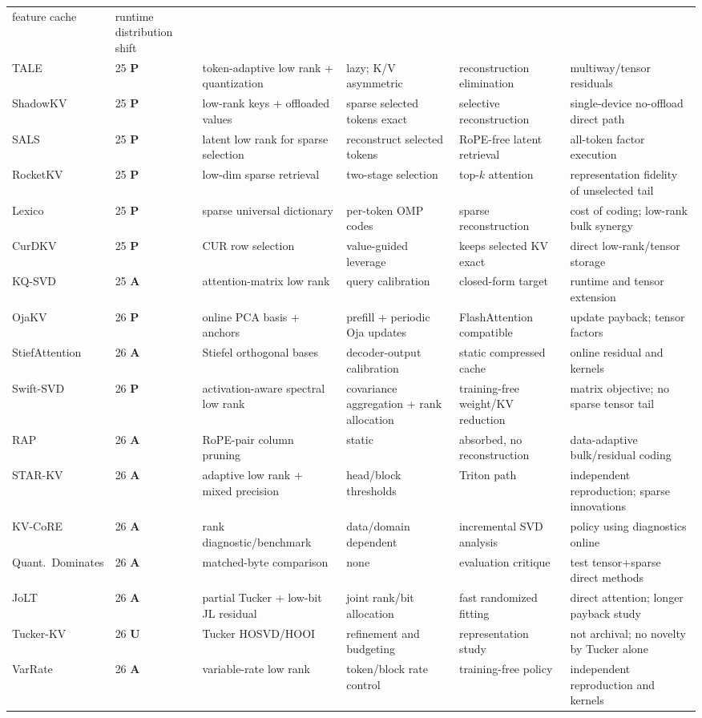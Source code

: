 \documentclass[10pt]{article}
\newcommand{\pub}{\textcolor{green!80!black}{\textbf{P}}}
\newcommand{\pre}{\textcolor{orange!90!black}{\textbf{A}}}
\newcommand{\unpub}{\textcolor{red!85!black}{\textbf{U}}}
\begin{document}
\begin{longtable}{@{}P{1.95cm}P{.9cm}P{2.5cm}P{2.55cm}P{2.75cm}P{2.7cm}@{}}
feature cache & runtime distribution shift \\
TALE & 25 \pub & token-adaptive low rank + quantization & lazy; K/V asymmetric & reconstruction
elimination & multiway/tensor residuals \\
ShadowKV & 25 \pub & low-rank keys + offloaded values & sparse selected tokens exact &
selective reconstruction & single-device no-offload direct path \\
SALS & 25 \pub & latent low rank for sparse selection & reconstruct selected tokens &
RoPE-free latent retrieval & all-token factor execution \\
RocketKV & 25 \pub & low-dim sparse retrieval & two-stage selection & top-$k$ attention &
representation fidelity of unselected tail \\
Lexico & 25 \pub & sparse universal dictionary & per-token OMP codes & sparse reconstruction &
cost of coding; low-rank bulk synergy \\
CurDKV & 25 \pub & CUR row selection & value-guided leverage & keeps selected KV exact &
direct low-rank/tensor storage \\
KQ-SVD & 25 \pre & attention-matrix low rank & query calibration & closed-form target &
runtime and tensor extension \\
OjaKV & 26 \pub & online PCA basis + anchors & prefill + periodic Oja updates & FlashAttention
compatible & update payback; tensor factors \\
StiefAttention & 26 \pre & Stiefel orthogonal bases & decoder-output calibration & static
compressed cache & online residual and kernels \\
Swift-SVD & 26 \pub & activation-aware spectral low rank & covariance aggregation + rank
allocation & training-free weight/KV reduction & matrix objective; no sparse tensor tail \\
RAP & 26 \pre & RoPE-pair column pruning & static & absorbed, no reconstruction & data-adaptive
bulk/residual coding \\
STAR-KV & 26 \pre & adaptive low rank + mixed precision & head/block thresholds & Triton path &
independent reproduction; sparse innovations \\
KV-CoRE & 26 \pre & rank diagnostic/benchmark & data/domain dependent & incremental SVD analysis &
policy using diagnostics online \\
Quant.\ Dominates & 26 \pre & matched-byte comparison & none & evaluation critique &
test tensor+sparse direct methods \\
JoLT & 26 \pre & partial Tucker + low-bit JL residual & joint rank/bit allocation &
fast randomized fitting & direct attention; longer payback study \\
Tucker-KV & 26 \unpub & Tucker HOSVD/HOOI & refinement and budgeting & representation study &
not archival; no novelty by Tucker alone \\
VarRate & 26 \pre & variable-rate low rank & token/block rate control & training-free policy &
independent reproduction and kernels \\
\bottomrule
\end{longtable}
\normalsize
\end{document}
